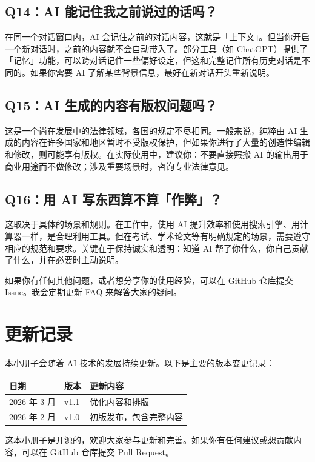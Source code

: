 \section*{Q14：AI 能记住我之前说过的话吗？}
在同一个对话窗口内，AI 会记住之前的对话内容，这就是「上下文」。但当你开启一个新对话时，之前的内容就不会自动带入了。部分工具（如 ChatGPT）提供了「记忆」功能，可以跨对话记住一些偏好设定，但这和完整记住所有历史对话是不同的。如果你需要 AI 了解某些背景信息，最好在新对话开头重新说明。

\section*{Q15：AI 生成的内容有版权问题吗？}
这是一个尚在发展中的法律领域，各国的规定不尽相同。一般来说，纯粹由 AI 生成的内容在许多国家和地区暂时不受版权保护，但如果你进行了大量的创造性编辑和修改，则可能享有版权。在实际使用中，建议你：不要直接照搬 AI 的输出用于商业用途而不做修改；涉及重要场景时，咨询专业法律意见。

\section*{Q16：用 AI 写东西算不算「作弊」？}
这取决于具体的场景和规则。在工作中，使用 AI 提升效率和使用搜索引擎、用计算器一样，是合理利用工具。但在考试、学术论文等有明确规定的场景，需要遵守相应的规范和要求。关键在于保持诚实和透明：知道 AI 帮了你什么，你自己贡献了什么，并在必要时主动说明。

\begin{tipbox}
如果你有任何其他问题，或者想分享你的使用经验，可以在 GitHub 仓库提交 Issue。我会定期更新 FAQ 来解答大家的疑问。
\end{tipbox}

\chapter{更新记录}
\label{ch:changelog}

本小册子会随着 AI 技术的发展持续更新。以下是主要的版本变更记录：

\begin{center}
\begin{tabular}{p{2.5cm}p{2cm}p{8cm}}
  \toprule
  \textbf{日期} & \textbf{版本} & \textbf{更新内容} \\
  \midrule
  2026 年 3 月 & v1.1 & 优化内容和排版 \\
  2026 年 2 月 & v1.0 & 初版发布，包含完整内容 \\
  \bottomrule
\end{tabular}
\end{center}

这本小册子是开源的，欢迎大家参与更新和完善。如果你有任何建议或想贡献内容，可以在 GitHub 仓库提交 Pull Request。